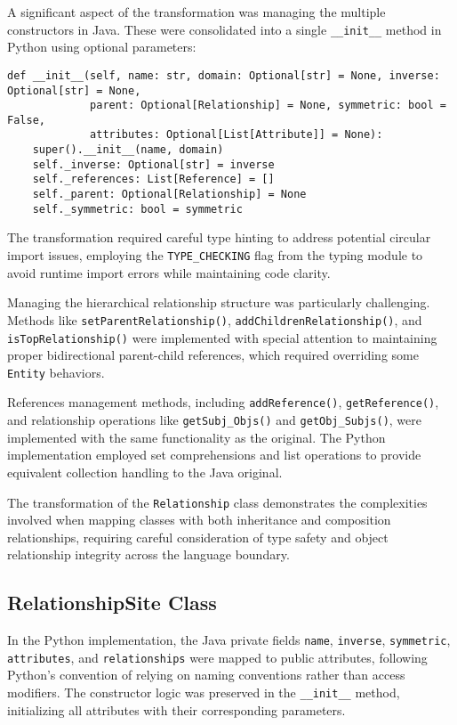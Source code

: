 \documentclass[12pt,a4paper]{article}
\begin{document}
A significant aspect of the transformation was managing the multiple constructors in Java. These were consolidated into a single \texttt{\_\_init\_\_} method in Python using optional parameters:

\begin{verbatim}
def __init__(self, name: str, domain: Optional[str] = None, inverse: Optional[str] = None,
             parent: Optional[Relationship] = None, symmetric: bool = False,
             attributes: Optional[List[Attribute]] = None):
    super().__init__(name, domain)
    self._inverse: Optional[str] = inverse
    self._references: List[Reference] = []
    self._parent: Optional[Relationship] = None
    self._symmetric: bool = symmetric
\end{verbatim}

The transformation required careful type hinting to address potential circular import issues, employing the \texttt{TYPE\_CHECKING} flag from the typing module to avoid runtime import errors while maintaining code clarity.

Managing the hierarchical relationship structure was particularly challenging. Methods like \texttt{setParentRelationship()}, \texttt{addChildrenRelationship()}, and \texttt{isTopRelationship()} were implemented with special attention to maintaining proper bidirectional parent-child references, which required overriding some \texttt{Entity} behaviors.

References management methods, including \texttt{addReference()}, \texttt{getReference()}, and relationship operations like \texttt{getSubj\_Objs()} and \texttt{getObj\_Subjs()}, were implemented with the same functionality as the original. The Python implementation employed set comprehensions and list operations to provide equivalent collection handling to the Java original.

The transformation of the \texttt{Relationship} class demonstrates the complexities involved when mapping classes with both inheritance and composition relationships, requiring careful consideration of type safety and object relationship integrity across the language boundary.


\subsection{RelationshipSite Class}

In the Python implementation, the Java private fields \texttt{name}, \texttt{inverse}, \texttt{symmetric}, \texttt{attributes}, and \texttt{relationships} were mapped to public attributes, following Python's convention of relying on naming conventions rather than access modifiers. The constructor logic was preserved in the \texttt{\_\_init\_\_} method, initializing all attributes with their corresponding parameters.
\end{document}
